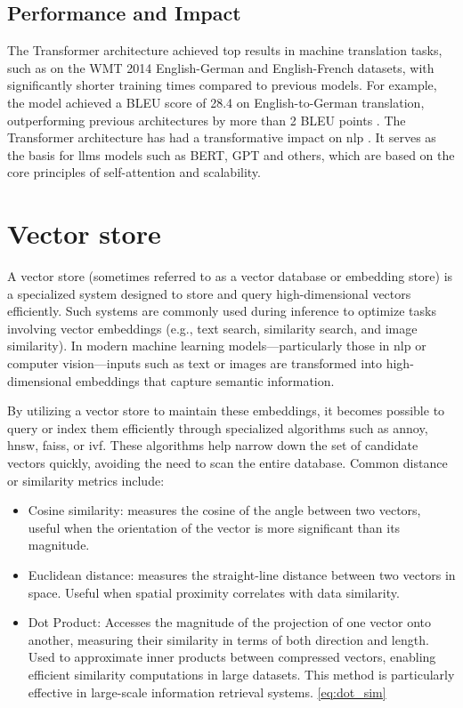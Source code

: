 



\subsection{Performance and Impact}  
The Transformer architecture achieved top results in machine translation tasks, such as on the WMT 2014 English-German and English-French datasets, with significantly shorter training times compared to previous models. For example, the model achieved a BLEU score of 28.4 on English-to-German translation, outperforming previous architectures by more than 2 BLEU points \cite{vaswani2017attention}.  
The Transformer architecture has had a transformative impact on \gls{nlp} . It serves as the basis for \glspl{llm} models such as BERT, GPT and others, which are based on the core principles of self-attention and scalability.


\section{Vector store}
A vector store (sometimes referred to as a vector database or embedding store) is a specialized system designed to store and query high-dimensional vectors efficiently. Such systems are commonly used during inference to optimize tasks involving vector embeddings (e.g., text search, similarity search, and image similarity). In modern machine learning models—particularly those in \gls{nlp} or computer vision—inputs such as text or images are transformed into high-dimensional embeddings that capture semantic information.

By utilizing a vector store to maintain these embeddings, it becomes possible to query or index them efficiently through specialized algorithms such as \gls{annoy}, \gls{hnsw}, \gls{faiss}, or \gls{ivf}. These algorithms help narrow down the set of candidate vectors quickly, avoiding the need to scan the entire database. Common distance or similarity metrics include:
\begin{itemize}
    \item Cosine similarity: measures the cosine of the angle between two vectors, useful when the orientation of the vector is more significant than its magnitude. 
    \item Euclidean distance: measures the straight-line distance between two vectors in space. Useful when spatial proximity correlates with data similarity.
    \item Dot Product: Accesses the magnitude of the projection of one vector onto another, measuring their similarity in terms of both direction and length. Used to approximate inner products between compressed vectors, enabling efficient similarity computations in large datasets. This method is particularly effective in large-scale information retrieval systems. \ref{eq:dot_sim}
\end{itemize}

